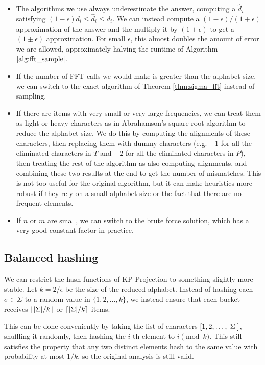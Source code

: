 \documentclass{article}
\theoremstyle{definition}
\newcommand{\eps}{\epsilon}
\DeclarePairedDelimiter{\ceil}{\lceil}{\rceil}
\DeclarePairedDelimiter{\floor}{\lfloor}{\rfloor}
\DeclarePairedDelimiter{\abs}{\lvert}{\rvert}
\begin{document}
\begin{itemize}
    \item The algorithms we use always underestimate the answer, computing a $\hat{d}_i$ satisfying $(1-\eps)d_i \leq \hat{d}_i \leq d_i$. We can instead compute a $(1 - \eps)/(1 + \eps)$ approximation of the answer and the multiply it by $(1 + \eps)$ to get a $(1 \pm \eps)$ approximation.
    For small $\eps$, this almost doubles the amount of error we are allowed, approximately halving the runtime of Algorithm $\ref{alg:fft_sample}$.
    \item If the number of FFT calls we would make is greater than the alphabet size, we can switch to the exact algorithm of Theorem \ref{thm:sigma_fft} instead of sampling.
    \item If there are items with very small or very large frequencies, we can treat them as light or heavy characters as in Abrahamson's square root algorithm to reduce the alphabet size.
    We do this by computing the alignments of these characters, then replacing them with dummy characters (e.g. $-1$ for all the eliminated characters in $T$ and $-2$ for all the eliminated characters in $P$), then treating the rest of the algorithm as also computing alignments, and combining these two results at the end to get the number of mismatches.
    This is not too useful for the original algorithm, but it can make heuristics more robust if they rely on a small alphabet size or the fact that there are no frequent elements.
    \item If $n$ or $m$ are small, we can switch to the brute force solution, which has a very good constant factor in practice.
\end{itemize}

\subsection{Balanced hashing} \label{sec:balenced_hash}

We can restrict the hash functions of KP Projection to something slightly more stable.
Let $k = 2/\eps$ be the size of the reduced alphabet.
Instead of hashing each $\sigma \in \Sigma$ to a random value in $\{1, 2, \ldots, k\}$, we instead ensure that each bucket receives $\floor{\abs{\Sigma}/k}$ or $\ceil{\abs{\Sigma}/k}$ items.

This can be done conveniently by taking the list of characters $[1, 2, \ldots, \abs{\Sigma}]$, shuffling it randomly, then hashing the $i$-th element to $i \pmod{k}$.
This still satisfies the property that any two distinct elements hash to the same value with probability at most $1/k$, so the original analysis is still valid.
\end{document}
